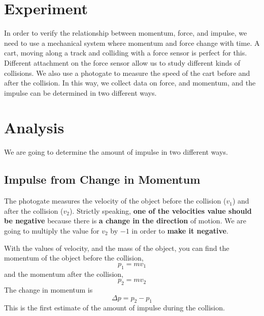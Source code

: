 \section{Experiment}
In order to verify the relationship between momentum, force, and impulse, we need to use a mechanical system where momentum and force change with time. A cart, moving along a track and colliding with a force sensor is perfect for this. Different attachment on the force sensor allow us to study different kinds of collisions. We also use a photogate to measure the speed of the cart before and after the collision. In this way, we collect data on force, and momentum, and the impulse can be determined in two different ways.
\section{Analysis}
We are going to determine the amount of impulse in two different ways.
\subsection{Impulse from Change in Momentum}
The photogate measures the velocity of the object before the collision ($v_{1}$) and after the collision ($v_{2}$). Strictly speaking, \textbf{one of the velocities value should be negative} because there is \textbf{a change in the direction} of motion. We are going to multiply the value for $v_{2}$ by $-1$ in order to \textbf{make it negative}.

With the values of velocity, and the mass of the object, you can find the momentum of the object before the collision,
\begin{equation}
    p_{1} = m v_{1}
\end{equation}
and the momentum after the collision,
\begin{equation}
    p_{2} = m v_{2}
\end{equation}
The change in momentum is
\begin{equation}
    \Delta p = p_{2} - p_{1}
\end{equation}
This is the first estimate of the amount of impulse during the collision.
